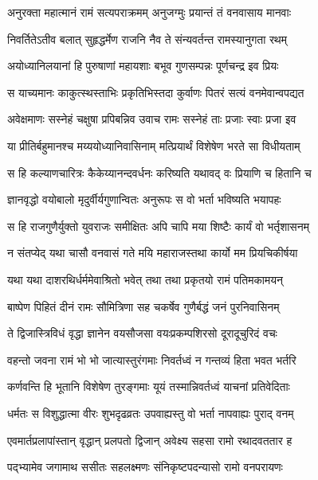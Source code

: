 
\twolineshloka
{अनुरक्ता महात्मानं रामं सत्यपराक्रमम्}
{अनुजग्मुः प्रयान्तं तं वनवासाय मानवाः} %

\twolineshloka
{निवर्तितेऽतीव बलात् सुहृद्धर्मेण राजनि}
{नैव ते संन्यवर्तन्त रामस्यानुगता रथम्} %

\twolineshloka
{अयोध्यानिलयानां हि पुरुषाणां महायशाः}
{बभूव गुणसम्पन्नः पूर्णचन्द्र इव प्रियः} %

\twolineshloka
{स याच्यमानः काकुत्स्थस्ताभिः प्रकृतिभिस्तदा}
{कुर्वाणः पितरं सत्यं वनमेवान्वपद्यत} %

\twolineshloka
{अवेक्षमाणः सस्नेहं चक्षुषा प्रपिबन्निव}
{उवाच रामः सस्नेहं ताः प्रजाः स्वाः प्रजा इव} %

\twolineshloka
{या प्रीतिर्बहुमानश्च मय्ययोध्यानिवासिनाम्}
{मत्प्रियार्थं विशेषेण भरते सा विधीयताम्} %

\twolineshloka
{स हि कल्याणचारित्रः कैकेय्यानन्दवर्धनः}
{करिष्यति यथावद् वः प्रियाणि च हितानि च} %

\twolineshloka
{ज्ञानवृद्धो वयोबालो मृदुर्वीर्यगुणान्वितः}
{अनुरूपः स वो भर्ता भविष्यति भयापहः} %

\twolineshloka
{स हि राजगुणैर्युक्तो युवराजः समीक्षितः}
{अपि चापि मया शिष्टैः कार्यं वो भर्तृशासनम्} %

\twolineshloka
{न संतप्येद् यथा चासौ वनवासं गते मयि}
{महाराजस्तथा कार्यो मम प्रियचिकीर्षया} %

\twolineshloka
{यथा यथा दाशरथिर्धर्ममेवाश्रितो भवेत्}
{तथा तथा प्रकृतयो रामं पतिमकामयन्} %

\twolineshloka
{बाष्पेण पिहितं दीनं रामः सौमित्रिणा सह}
{चकर्षेव गुणैर्बद्धं जनं पुरनिवासिनम्} %

\twolineshloka
{ते द्विजास्त्रिविधं वृद्धा ज्ञानेन वयसौजसा}
{वयःप्रकम्पशिरसो दूरादूचुरिदं वचः} %

\twolineshloka
{वहन्तो जवना रामं भो भो जात्यास्तुरंगमाः}
{निवर्तध्वं न गन्तव्यं हिता भवत भर्तरि} %

\twolineshloka
{कर्णवन्ति हि भूतानि विशेषेण तुरङ्गमाः}
{यूयं तस्मान्निवर्तध्वं याचनां प्रतिवेदिताः} %

\twolineshloka
{धर्मतः स विशुद्धात्मा वीरः शुभदृढव्रतः}
{उपवाह्यस्तु वो भर्ता नापवाह्यः पुराद् वनम्} %

\twolineshloka
{एवमार्तप्रलापांस्तान् वृद्धान् प्रलपतो द्विजान्}
{अवेक्ष्य सहसा रामो रथादवततार ह} %

\twolineshloka
{पद्भ्यामेव जगामाथ ससीतः सहलक्ष्मणः}
{संनिकृष्टपदन्यासो रामो वनपरायणः} %

